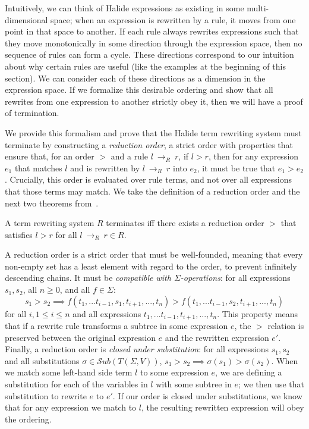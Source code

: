 \documentclass[acmsmall]{acmart}\settopmatter{}
\newcommand{\rewrites}[0]{\:\rightarrow_{R}\:}
\begin{document}
Intuitively, we can think of Halide expressions as existing in some multi-dimensional space; when an expression is rewritten by a rule, it moves from one point in that space to another. If each rule always rewrites expressions such that they move monotonically in some direction through the expression space, then no sequence of rules can form a cycle. These directions correspond to our intuition about why certain rules are useful (like the examples at the beginning of this section). We can consider each of these directions as a dimension in the expression space. If we formalize this desirable ordering and show that all rewrites from one expression to another strictly obey it, then we will have a proof of termination.

We provide this formalism and prove that the Halide term rewriting system must terminate by constructing a \emph{reduction order}, a strict order with properties that ensure that, for an order $>$ and a rule $l \rewrites r$, if $l > r$, then for any expression $e_1$ that matches $l$ and is rewritten by $l \rewrites r$ into $e_2$, it must be true that $e_1 > e_2$. Crucially, this order is evaluated over rule terms, and not over all expressions that those terms may match. We take the definition of a reduction order and the next two theorems from~\citet{baader1999term}.

\begin{theorem}\label{theorem:terminates}
A term rewriting system $R$ terminates iff there exists a reduction order $>$ that satisfies $l > r$ for all $l \rewrites r \in R$.
\end{theorem}

A reduction order is a strict order that must be well-founded, meaning that every non-empty set has a least element with regard to the order, to prevent infinitely descending chains. It must be \emph{compatible with $\Sigma$-operations}: for all expressions $s_1, s_2$, all $n \geq 0$, and all $f \in \Sigma$:
\[
s_1 > s_2 \implies f(t_1,...t_{i-1},s_1,t_{i+1},...,t_n) > f(t_1,...t_{i-1},s_2,t_{i+1},...,t_n)
\]
for all $i, 1 \leq i \leq n$ and all expressions $t_1,...t_{i-1},t_{i+1},...,t_n$. This property means that if a rewrite rule transforms a subtree in some expression $e$, the $>$ relation is preserved between the original expression $e$ and the rewritten expression $e'$. Finally, a reduction order is \emph{closed under substitution}: for all expressions $s_1, s_2$ and all substitutions $\sigma \in \mathcal{S}ub(T(\Sigma,V))$, 
$s_1 > s_2 \implies \sigma(s_1) > \sigma(s_2)$. When we match some left-hand side term $l$ to some expression $e$, we are defining a substitution for each of the variables in $l$ with some subtree in $e$; we then use that substitution to rewrite $e$ to $e'$. If our order is closed under substitutions, we know that for any expression we match to $l$, the resulting rewritten expression will obey the ordering.
\end{document}
